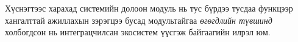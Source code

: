 Хүснэгтээс харахад системийн долоон модуль нь тус бүрдээ тусдаа функцээр хангалттай ажиллахын зэрэгцээ бусад модультайгаа \textit{өгөгдлийн түвшинд} холбогдсон нь интеграцчилсан экосистем үүсгэж байгаагийн илрэл юм.












